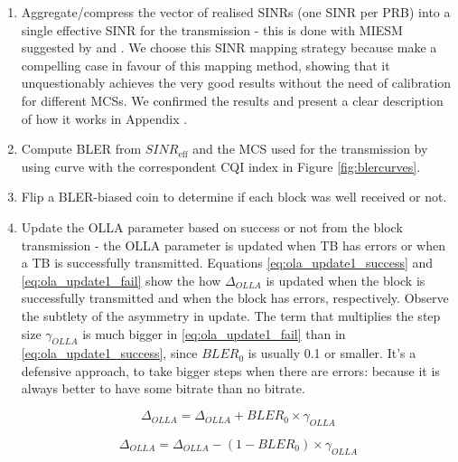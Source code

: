 \begin{enumerate}
    \item Aggregate/compress the vector of realised SINRs (one SINR per PRB) into a single effective SINR for the transmission - this is done with \ac{MIESM} suggested by \cite{1696622} and \cite{1656798}. We choose this SINR mapping strategy because \cite{1656798, 4657235, 5982870, 6008103, miesm1} make a compelling case in favour of this mapping method, showing that it unquestionably achieves the very good results without the need of calibration for different MCSs. We confirmed the results and present a clear description of how it works in Appendix \cite{ap:c}. 

    \item Compute \ac{BLER} from $SINR_\text{eff}$ and the MCS used for the transmission by using curve with the correspondent CQI index in Figure \ref{fig:blercurves}.
    
    \item Flip a \acs{BLER}-biased coin to determine if each block was well received or not.
    
    \item Update the \acs{OLLA} parameter based on success or not from the block transmission - the OLLA parameter is updated when \ac{TB} has errors or when a TB is successfully transmitted. Equations \eqref{eq:ola_update1_success} and \eqref{eq:ola_update1_fail} show the how $\Delta_{OLLA}$ is updated when the block is successfully transmitted and when the block has errors, respectively. Observe the subtlety of the asymmetry in update. The term that multiplies the step size $\gamma_{OLLA}$ is much bigger in \eqref{eq:ola_update1_fail} than in \eqref{eq:ola_update1_success}, since $BLER_0$ is usually 0.1 or smaller. It's a defensive approach, to take bigger steps when there are errors: because it is always better to have some bitrate than no bitrate.
    

    \begin{equation} \label{eq:ola_update1_success}
        \Delta_{OLLA} = \Delta_{OLLA} + BLER_0 \times \gamma_{OLLA}
    \end{equation}

    \begin{equation} \label{eq:ola_update1_fail}
        \Delta_{OLLA} = \Delta_{OLLA} - (1 - BLER_0) \times \gamma_{OLLA}
    \end{equation}
\end{enumerate}




